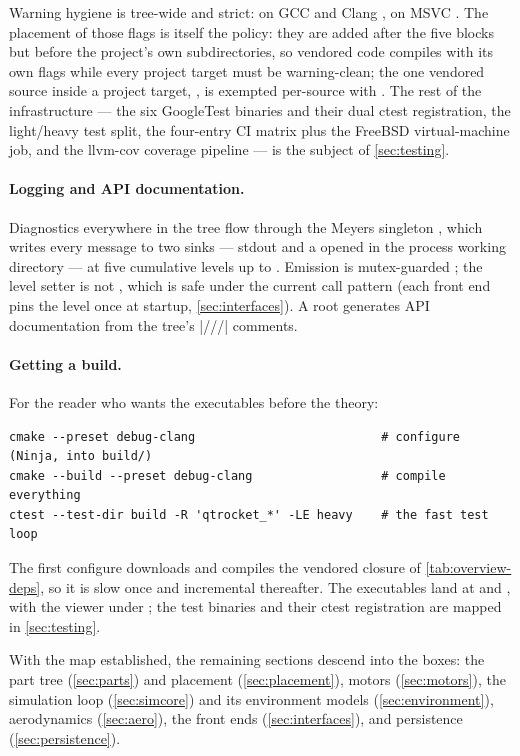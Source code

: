Warning hygiene is tree-wide and strict:  on GCC
and Clang ,  on MSVC . The
placement of those flags is itself the policy: they are added after the five
 blocks but before the project's own subdirectories, so vendored code
compiles with its own flags while every project target must be warning-clean; the one
vendored source inside a project target, , is exempted
per-source with  . The rest of the infrastructure ---
the six GoogleTest binaries and their dual ctest registration, the light/heavy test split,
the four-entry CI matrix plus the FreeBSD virtual-machine job, and the llvm-cov
coverage pipeline --- is the subject of \cref{sec:testing}.

\paragraph{Logging and API documentation.} Diagnostics everywhere in the tree flow through
the  Meyers singleton , which writes every
message to two sinks --- stdout and a  opened in the process working
directory  --- at five cumulative levels up to 
. Emission is mutex-guarded ; the level
setter is not , which is safe under the current call pattern
(each front end pins the level once at startup, \cref{sec:interfaces}). A root
 generates API documentation from the tree's \cppinline|///| comments.

\paragraph{Getting a build.} For the reader who wants the executables before the theory:

\begin{verbatim}
cmake --preset debug-clang                          # configure (Ninja, into build/)
cmake --build --preset debug-clang                  # compile everything
ctest --test-dir build -R 'qtrocket_*' -LE heavy    # the fast test loop
\end{verbatim}

\noindent The first configure downloads and compiles the vendored closure of
\cref{tab:overview-deps}, so it is slow once and incremental thereafter. The executables
land at  and , with the viewer under
; the test binaries and their ctest registration are mapped in
\cref{sec:testing}.

With the map established, the remaining sections descend into the boxes: the part tree
(\cref{sec:parts}) and placement (\cref{sec:placement}), motors (\cref{sec:motors}), the
simulation loop (\cref{sec:simcore}) and its environment models (\cref{sec:environment}),
aerodynamics (\cref{sec:aero}), the front ends (\cref{sec:interfaces}), and persistence
(\cref{sec:persistence}).
